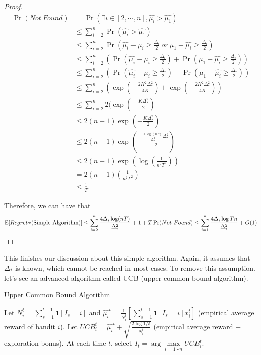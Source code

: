 \documentclass[../main.tex]{subfiles}
\begin{document}
\begin{proof}
	\begin{equation*}
		\begin{aligned}
			\Pr(Not\ Found) &= \Pr(\exists i \in [2,\cdots,n], \hat{\mu_i} > \hat{\mu_1}) \\
			&\leq \sum\limits_{i=2}^n \Pr (\hat{\mu_i} > \hat{\mu_1}) \\
			&\leq \sum\limits_{i=2}^n \Pr (\hat{\mu_i}  - \mu_i \geq \frac{\Delta_i}{2} \ or \ \mu_1 - \hat{\mu_i}  \geq \frac{\Delta_i}{2}) \\
			&\leq \sum\limits_{i=2}^n (\Pr (\hat{\mu_i}  - \mu_i \geq \frac{\Delta_i}{2}) +  \Pr(\mu_1 - \hat{\mu_i}  \geq \frac{\Delta_i}{2})) \\
			&\leq \sum\limits_{i=2}^n (\Pr (\hat{\mu_i}  - \mu_i \geq \frac{\Delta_*}{2}) +  \Pr(\mu_1 - \hat{\mu_i}  \geq \frac{\Delta_*}{2})) \\
			&\leq \sum\limits_{i=2}^n (\exp(-\frac{2K^2 \Delta_*^2 }{4K}) +  \exp(-\frac{2K^2 \Delta_*^2 }{4K})) \\
			&\leq \sum\limits_{i=2}^n 2(\exp(-\frac{K \Delta_*^2 }{2})  \\
			&\leq 2(n-1)\exp(-\frac{K \Delta_*^2 }{2}) \\
			&\leq 2(n-1)\exp(-\frac{ \frac{4 \log(nT)}{\Delta_*^2} \Delta_*^2 }{2}) \\
			&\leq 2(n-1)\exp( \log(\frac{1}{n^2T^2})) \\
			&= 2(n-1)(\frac{1}{n^2T^2}) \\
			& \leq \frac{1}{T}.
		\end{aligned}
	\end{equation*}
	
	Therefore, we can have that 
	\begin{equation*}
	\mathbb{E}[Regret_T(\textmd{Simple Algorithm})] \leq \sum\limits_{i=2}^n  \frac{4\Delta_i \log(nT)}{\Delta_*^2} + 1 + T \Pr(Not \ Found) \leq  \sum\limits_{i=1}^n \frac{4 \Delta_i \log Tn}{\Delta_*^2} + O(1)	
	\end{equation*}
\end{proof}

	This finishes our discussion about this simple algorithm. Again, it assumes that $\Delta_*$ is known, which cannot be reached in most cases. To remove this assumption. let's see an advanced algorithm called UCB (upper common bound algorithm).
	
	\begin{algorithm}[H]
		\caption{Upper Common Bound Algorithm}
		\begin{algorithmic}
			\STATE Let $N_i^t = \sum\limits_{s=1}^{t-1} \mathbf{1} [I_s = i]$ and $\hat{\mu_i}^t = \frac{1}{N_i^t} [\sum\limits_{s=1}^{t-1} \mathbf{1}[I_s = i] x_i^t]$ (empirical average reward of bandit $i$).
			\STATE Let $UCB_i^t = \hat{\mu_i}^t + \sqrt{\frac{2\log 1 /\delta}{N_i^t}}$ (empirical average reward + exploration bonus).
			\STATE At each time $t$, select $I_t = \arg\max\limits_{i=1\cdots n} UCB_i^t$.
		\end{algorithmic}
	\end{algorithm}
	
\end{document}
